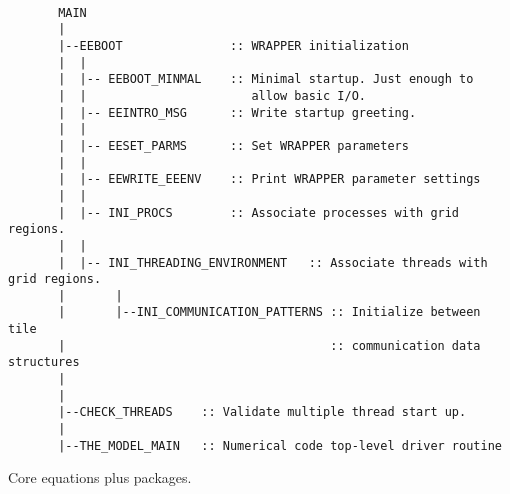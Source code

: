 {\footnotesize
\begin{verbatim}

       MAIN  
       |
       |--EEBOOT               :: WRAPPER initialization
       |  |
       |  |-- EEBOOT_MINMAL    :: Minimal startup. Just enough to
       |  |                       allow basic I/O.
       |  |-- EEINTRO_MSG      :: Write startup greeting.
       |  |
       |  |-- EESET_PARMS      :: Set WRAPPER parameters
       |  |
       |  |-- EEWRITE_EEENV    :: Print WRAPPER parameter settings
       |  |
       |  |-- INI_PROCS        :: Associate processes with grid regions.
       |  |
       |  |-- INI_THREADING_ENVIRONMENT   :: Associate threads with grid regions.
       |       |
       |       |--INI_COMMUNICATION_PATTERNS :: Initialize between tile 
       |                                     :: communication data structures
       |
       |
       |--CHECK_THREADS    :: Validate multiple thread start up.
       |
       |--THE_MODEL_MAIN   :: Numerical code top-level driver routine

\end{verbatim}
}

Core equations plus packages.

